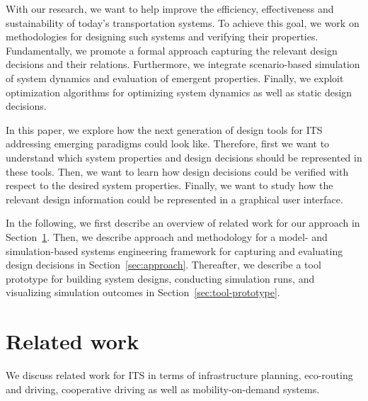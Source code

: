 \documentclass[a4paper,twoside]{article}
\begin{document}
	
	With our research, we want to help improve the efficiency, effectiveness and sustainability of today's transportation systems.
	To achieve this goal, we work on methodologies for designing such systems and verifying their properties.
	Fundamentally, we promote a formal approach capturing the relevant design decisions and their relations.
	Furthermore, we integrate scenario-based simulation of system dynamics and evaluation of emergent properties.
	Finally, we exploit optimization algorithms for optimizing system dynamics as well as static design decisions.
	
	
	In this paper, we explore how the next generation of design tools for ITS addressing emerging paradigms could look like.
	Therefore, first we want to understand which system properties and design decisions should be represented in these tools.
	Then, we want to learn how design decisions could be verified with respect to the desired system properties.
	Finally, we want to study how the relevant design information could be represented in a graphical user interface.
	
	
	In the following, we first describe an overview of related work for our approach in Section~\ref{sec:related-work}. Then, we describe approach and methodology for a model- and simulation-based systems engineering framework for capturing and evaluating design decisions in Section~\ref{sec:approach}.
	Thereafter, we describe a tool prototype for building system designs, conducting simulation runs, and visualizing simulation outcomes in Section~\ref{sec:tool-prototype}.
	
	\section{Related work}
	\label{sec:related-work}
	We discuss related work for ITS in terms of infrastructure planning, eco-routing and driving, cooperative driving as well as mobility-on-demand systems.
\end{document}
